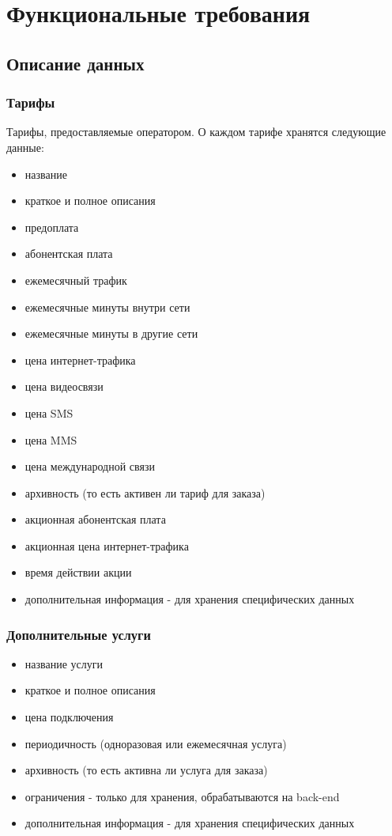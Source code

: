 \section{Функциональные требования}

\subsection{Описание данных}

\subsubsection{Тарифы}
Тарифы, предоставляемые оператором. О каждом тарифе хранятся следующие данные:
\begin{itemize}
    \item название
    \item краткое и полное описания
    \item предоплата
    \item абонентская плата
    \item ежемесячный трафик
    \item ежемесячные минуты внутри сети
    \item ежемесячные минуты в другие сети
    \item цена интернет-трафика
    \item цена видеосвязи
    \item цена SMS
    \item цена MMS
    \item цена международной связи
    \item архивность (то есть активен ли тариф для заказа)
    \item акционная абонентская плата
    \item акционная цена интернет-трафика
    \item время действии акции
    \item дополнительная информация - для хранения специфических данных
\end{itemize}

\subsubsection{Дополнительные услуги}
\begin{itemize}
    \item название услуги
    \item краткое и полное описания
    \item цена подключения
    \item периодичность (одноразовая или ежемесячная услуга)
    \item архивность (то есть активна ли услуга для заказа)
    \item ограничения - только для хранения, обрабатываются на back-end
    \item дополнительная информация - для хранения специфических данных
\end{itemize}

